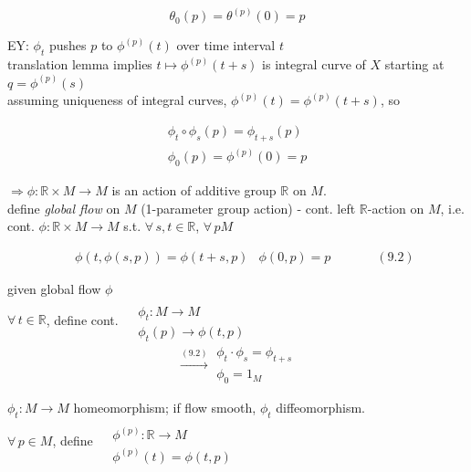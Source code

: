 \[
\theta_0(p) = \theta^{(p)}(0) = p
\]

EY: $\phi_t$ pushes $p$ to $\phi^{(p)}(t)$ over time interval $t$ \\

translation lemma implies $t\mapsto \phi^{(p)}(t+s)$ is integral curve of $X$ starting at $q = \phi^{(p)}(s)$  \\

assuming uniqueness of integral curves, $\phi^{(p)}(t) = \phi^{(p)}(t+s)$, so 

\[
\begin{gathered}
  \phi_t \circ \phi_s(p) = \phi_{t+s}(p) \\ 
  \phi_0(p) = \phi^{(p)}(0) = p 
\end{gathered}
\]

$\Longrightarrow \phi : \mathbb{R}\times M \to M$ is an action of additive group $\mathbb{R}$ on $M$.  \\

define \emph{ global flow } on $M$ (1-parameter group action) - cont. left $\mathbb{R}$-action on $M$, i.e. \\
\quad cont. $\phi : \mathbb{R} \times M \to M$ s.t. $\forall \, s,t \in \mathbb{R}$, $\forall \, p M$ 

\begin{equation}
\begin{aligned}
& \phi(t, \phi(s,p) ) = \phi(t+s, p )
& \phi(0,p) = p 
\end{aligned} \quad \quad \quad \, (9.2)
\end{equation}

given global flow $\phi$ \\

$\forall \, t \in \mathbb{R}$, define cont. $\begin{aligned} & \quad \\
  & \phi_t: M \to M \\
  & \phi_t(p) \to \phi(t,p)
\end{aligned}$  
\[
\xrightarrow{ (9.2) } \begin{gathered}
  \phi_t \cdot \phi_s = \phi_{t+s} \\ 
  \phi_0 = 1_M
\end{gathered}
\]

$\phi_t : M \to M$ homeomorphism; if flow smooth, $\phi_t$ diffeomorphism.   \\

$\forall \, p \in M$, define $ \begin{aligned} & \quad \\ & \phi^{(p)}:\mathbb{R} \to M \\ & \phi^{(p)}(t) = \phi(t,p) \end{aligned}$ \\


